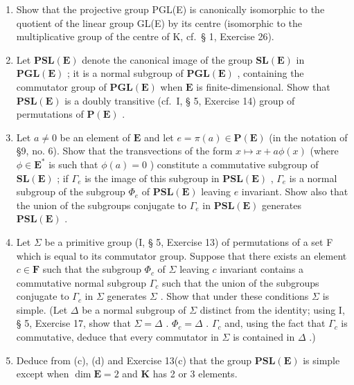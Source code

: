 \begin{enumerate}
\def\labelenumi{(\alph{enumi})}
\item
  Show that the projective group PGL(E) is canonically isomorphic to the quotient of the linear group GL(E) by its centre (isomorphic to the multiplicative group of the centre of K, cf.~§ 1, Exercise 26).
\item
  Let \(\mathbf{PSL}(\mathbf{E})\) denote the canonical image of the group \(\mathbf{SL}(\mathbf{E})\) in \(\mathbf{PGL}(\mathbf{E})\) ; it is a normal subgroup of \(\mathbf{PGL}(\mathbf{E})\) , containing the commutator group of \(\mathbf{PGL}(\mathbf{E})\) when \(\mathbf{E}\) is finite-dimensional. Show that \(\mathbf{PSL}(\mathbf{E})\) is a doubly transitive (cf.~I, § 5, Exercise 14) group of permutations of \(\mathbf{P}(\mathbf{E})\) .
\item
  Let \(a \neq 0\) be an element of \(\mathbf{E}\) and let \(e = \pi(a) \in \mathbf{P}(\mathbf{E})\) (in the notation of §9, no. 6). Show that the transvections of the form \(x \mapsto x + a\phi(x)\) (where \(\phi \in \mathbf{E}^*\) is such that \(\phi(a) = 0\) ) constitute a commutative subgroup of \(\mathbf{SL}(\mathbf{E})\) ; if \(\Gamma_e\) is the image of this subgroup in \(\mathbf{PSL}(\mathbf{E})\) , \(\Gamma_e\) is a normal subgroup of the subgroup \(\Phi_e\) of \(\mathbf{PSL}(\mathbf{E})\) leaving \(e\) invariant. Show also that the union of the subgroups conjugate to \(\Gamma_e\) in \(\mathbf{PSL}(\mathbf{E})\) generates \(\mathbf{PSL}(\mathbf{E})\) .
\item
  Let \(\Sigma\) be a primitive group (I, § 5, Exercise 13) of permutations of a set F which is equal to its commutator group. Suppose that there exists an element \(c \in \mathbf{F}\) such that the subgroup \(\Phi_c\) of \(\Sigma\) leaving \(c\) invariant contains a commutative normal subgroup \(\Gamma_c\) such that the union of the subgroups conjugate to \(\Gamma_c\) in \(\Sigma\) generates \(\Sigma\) . Show that under these conditions \(\Sigma\) is simple. (Let \(\Delta\) be a normal subgroup of \(\Sigma\) distinct from the identity; using I, § 5, Exercise 17, show that \(\Sigma = \Delta\) . \(\Phi_c = \Delta\) . \(\Gamma_c\) and, using the fact that \(\Gamma_c\) is commutative, deduce that every commutator in \(\Sigma\) is contained in \(\Delta\) .)
\item
  Deduce from (c), (d) and Exercise 13(c) that the group \(\mathbf{PSL}(\mathbf{E})\) is simple except when \(\dim \mathbf{E} = 2\) and \(\mathbf{K}\) has 2 or 3 elements.
\end{enumerate}


